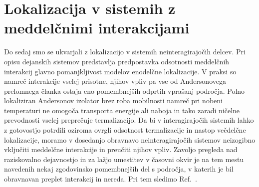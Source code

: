 \section{Lokalizacija v sistemih z meddelčnimi interakcijami}
Do sedaj smo se ukvarjali z lokalizacijo v sistemih neinteragirajočih delcev. Pri opisu dejanskih sistemov predstavlja predpostavka odsotnosti meddelčnih interakcij glavno pomanjkljivost modelov enodelčne lokalizacije. V praksi so namreč interakcije vselej prisotne, njihov vpliv pa vse od Andersonovega prelomnega članka ostaja eno pomembnejših odprtih vprašanj področja. Polno lokaliziran Andersonov izolator brez roba mobilnosti namreč pri nobeni temperaturi ne omogoča transporta energije ali naboja in tako zaradi ničelne prevodnosti vselej preprečuje termalizacijo. Da bi v interagirajočih sistemih lahko z gotovostjo potrdili oziroma ovrgli odsotnost termalizacije in nastop večdelčne lokalizacije, moramo v dosedanjo obravnavo neinteragirajočih sistemov neizogibno vključiti meddelčne interakcije in preučiti njihov vpliv. Zavoljo pregleda nad raziskovalno dejavnostjo in za lažjo umestitev v časovni okvir je na tem mestu navedenih nekaj zgodovinsko pomembnejših del s področja, v katerih je bil obravnavan preplet interakcij in nereda. Pri tem sledimo Ref.~\cite{abanin2018ergodicity}.\\\\
